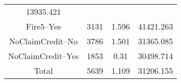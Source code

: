 \documentclass[]{book}
\theoremstyle{definition}
\theoremstyle{definition}
\theoremstyle{definition}
\theoremstyle{remark}
\begin{document}
\begin{longtable}[]{@{}cccc@{}}
\begin{minipage}[t]{0.14\columnwidth}
13935.421\strut
\end{minipage}\tabularnewline
\begin{minipage}[t]{0.26\columnwidth}\centering\strut
Fire5--Yes\strut
\end{minipage} & \begin{minipage}[t]{0.14\columnwidth}\centering\strut
3131\strut
\end{minipage} & \begin{minipage}[t]{0.11\columnwidth}\centering\strut
1.596\strut
\end{minipage} & \begin{minipage}[t]{0.14\columnwidth}\centering\strut
41421.263\strut
\end{minipage}\tabularnewline
\begin{minipage}[t]{0.26\columnwidth}\centering\strut
NoClaimCredit--No\strut
\end{minipage} & \begin{minipage}[t]{0.14\columnwidth}\centering\strut
3786\strut
\end{minipage} & \begin{minipage}[t]{0.11\columnwidth}\centering\strut
1.501\strut
\end{minipage} & \begin{minipage}[t]{0.14\columnwidth}\centering\strut
31365.085\strut
\end{minipage}\tabularnewline
\begin{minipage}[t]{0.26\columnwidth}\centering\strut
NoClaimCredit--Yes\strut
\end{minipage} & \begin{minipage}[t]{0.14\columnwidth}\centering\strut
1853\strut
\end{minipage} & \begin{minipage}[t]{0.11\columnwidth}\centering\strut
0.31\strut
\end{minipage} & \begin{minipage}[t]{0.14\columnwidth}\centering\strut
30498.714\strut
\end{minipage}\tabularnewline
\begin{minipage}[t]{0.26\columnwidth}\centering\strut
Total\strut
\end{minipage} & \begin{minipage}[t]{0.14\columnwidth}\centering\strut
5639\strut
\end{minipage} & \begin{minipage}[t]{0.11\columnwidth}\centering\strut
1.109\strut
\end{minipage} & \begin{minipage}[t]{0.14\columnwidth}\centering\strut
31206.155\strut
\end{minipage}\tabularnewline
\bottomrule
\end{longtable}
\end{document}

